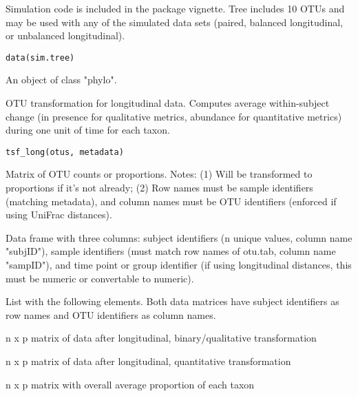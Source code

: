 \documentclass[a4paper]{book}
\begin{document}
%
\begin{Description}\relax
Simulation code is included in the package vignette. 
Tree includes 10 OTUs and may be used with any of the 
simulated data sets (paired, balanced longitudinal, or 
unbalanced longitudinal).
\end{Description}
%
\begin{Usage}
\begin{verbatim}
data(sim.tree)
\end{verbatim}
\end{Usage}
%
\begin{Format}
An object of class "phylo".
\end{Format}
%
\begin{Description}\relax
OTU transformation for longitudinal data. Computes average within-subject change 
(in presence for qualitative metrics, abundance for quantitative metrics) 
during one unit of time for each taxon.
\end{Description}
%
\begin{Usage}
\begin{verbatim}
tsf_long(otus, metadata)
\end{verbatim}
\end{Usage}
%
\begin{Arguments}
\begin{ldescription}
\item[\code{otus}] Matrix of OTU counts or proportions. Notes: (1) Will be transformed to 
proportions if it's not already; (2) Row names must be sample identifiers 
(matching metadata), and column names must be OTU identifiers (enforced if 
using UniFrac distances).

\item[\code{metadata}] Data frame with three columns: subject identifiers (n unique values, column name "subjID"), 
sample identifiers (must match row names of otu.tab, column name "sampID"), 
and time point or group identifier (if using longitudinal distances, this must be numeric or 
convertable to numeric).
\end{ldescription}
\end{Arguments}
%
\begin{Value}
List with the following elements. Both data matrices have subject identifiers 
as row names and OTU identifiers as column names.  
\begin{ldescription}
\item[\code{dat.binary}] n x p matrix of data after longitudinal, binary/qualitative transformation
\item[\code{dat.quant}] n x p matrix of data after longitudinal, quantitative transformation
\item[\code{avg.prop}] n x p matrix with overall average proportion of each taxon
\end{ldescription}
\end{Value}
\end{document}

